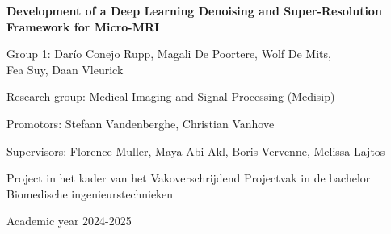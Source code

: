 \documentclass[twocolumn]{article}
\begin{document}
\begin{titlepage}
    \centering
    \vspace*{\fill}
    
    {\LARGE \textbf{Development of a Deep Learning Denoising and Super-Resolution Framework for Micro-MRI} \par}
    \vspace{0.5cm}

    {\Large Group 1: Darío Conejo Rupp, Magali De Poortere, Wolf De Mits,\\
     Fea Suy, Daan Vleurick \par}
    \vspace{2cm}

    {\large Research group: Medical Imaging and Signal Processing (Medisip) \par}
    \vspace{0.2cm}

    {\large Promotors: Stefaan Vandenberghe, Christian Vanhove \par}
    \vspace{0.2cm}

    {\large Supervisors: Florence Muller, Maya Abi Akl, Boris Vervenne, Melissa Lajtos \par}

    \vspace{2cm}

    {\large {Project in het kader van het Vakoverschrijdend Projectvak in de bachelor Biomedische ingenieurstechnieken} \par}
    {\large {Academic year 2024-2025} \par}

    \vspace*{\fill}
\end{titlepage}
\end{document}
